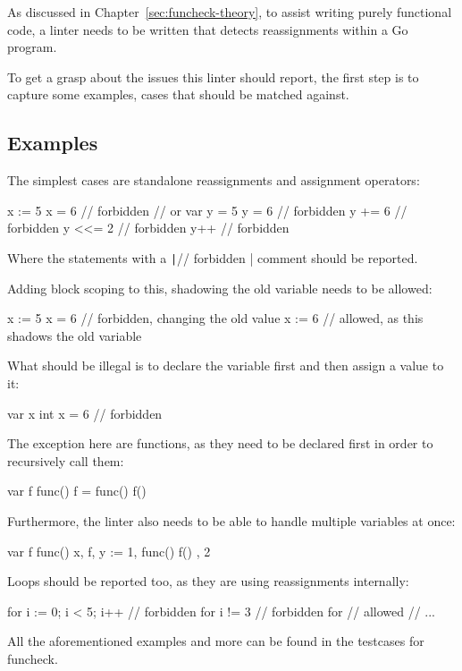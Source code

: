 As discussed in Chapter~\ref{sec:funcheck-theory}, to assist writing purely
functional code, a linter needs to be written that detects reassignments within
a Go program.

To get a grasp about the issues this linter should report, the first step
is to capture some examples, cases that should be matched against.

\subsection{Examples}

The simplest cases are standalone reassignments and assignment operators:
\begin{gocode}
x := 5
x = 6 // forbidden
// or
var y = 5
y = 6   // forbidden
y += 6  // forbidden
y <<= 2 // forbidden
y++     // forbidden
\end{gocode}

Where the statements with a \texttt|// forbidden
| comment should be reported.

Adding block scoping to this, shadowing the old variable needs to be allowed:
\begin{gocode}
x := 5
{
	x = 6  // forbidden, changing the old value
	x := 6 // allowed, as this shadows the old variable
}
\end{gocode}

What should be illegal is to declare the variable first and then assign a
value to it:
\begin{gocode}
var x int
x = 6 // forbidden
\end{gocode}

The exception here are functions, as they need to be declared first in order
to recursively call them:
\begin{gocode}
var f func()
f = func() {
	f()
}
\end{gocode}

Furthermore, the linter also needs to be able to handle multiple variables
at once:
\begin{gocode}
var f func()
x, f, y := 1, func() { f() }, 2
\end{gocode}

Loops should be reported too, as they are using reassignments internally:
\begin{gocode}
for i := 0; i < 5; i++ { // forbidden
	for i != 3 { // forbidden
		for { // allowed
			// ...
		}
	}
}
\end{gocode}

All the aforementioned examples and more can be found in the testcases for funcheck\autocite{funcheck-examples}.

